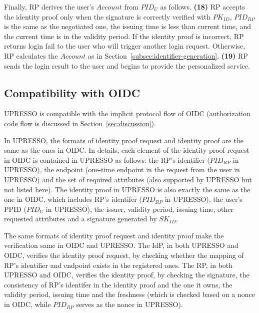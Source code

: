 Finally, RP derives the user's  $Account$ from $PID_U$ as follows. \textbf{(18)} RP accepts the identity proof only when the signature is correctly verified with $PK_{ID}$, $PID_{RP}$ is the same as the negotiated one, the issuing time is less than current time, and the current time is in the validity period. If the identity proof is incorrect, RP returns login fail to the user who will trigger another login request. Otherwise, RP calculates the $Account$ as in Section~\ref{subsec:identifier-generation}. \textbf{(19)} RP sends the login result to the user and begins to provide the personalized service.


\subsection{Compatibility with OIDC}
\label{subsec:compatible}
UPRESSO is compatible with the implicit protocol flow of OIDC (authorization code flow is discussed in Section~\ref{sec:discussion}).

In UPRESSO, the formats of identity proof request and identity proof are the same as the ones in OIDC. In details, each element of the identity proof request in OIDC is contained in UPRESSO as follows: the RP's identifier ($PID_{RP}$ in UPRESSO), the endpoint (one-time endpoint in the request from the user in UPRESSO) and the set of required attributes (also supported by UPRESSO but not listed here). The identity proof in UPRESSO is also exactly the same as the one in OIDC, which includes RP's identifer ($PID_{RP}$ in UPRESSO), the user's PPID ($PID_U$ in UPRESSO), the issuer, validity period, issuing time, other requested attributes and a signature generated by $SK_{ID}$. %

The same formats of identity proof request and identity proof make the verification same in OIDC and UPRESSO. The IdP, in both UPRESSO and OIDC, verifies the identity proof request, by checking whether the mapping of RP's identifier and endpoint exists in the registered ones. The RP, in both UPRESSO and OIDC, verifies the identity proof, by checking the signature, the consistency of RP's identifer in the identity proof and the one it owns, the validity period, issuing time and the freshness (which is checked based on a nonce in  OIDC, while  $PID_{RP}$ serves as the nonce in UPRESSO).

